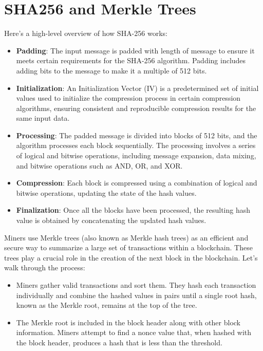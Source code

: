 \documentclass{article}
\begin{document}
\section{SHA256 and Merkle Trees}
Here's a high-level overview of how SHA-256 works:
\begin{itemize}
\item \textbf{Padding}: The input message is padded with length of message to ensure it meets certain requirements for the SHA-256 algorithm. Padding includes adding bits to the message to make it a multiple of 512 bits.
\item \textbf{Initialization}: An Initialization Vector (IV) is a predetermined set of initial values used to initialize the compression process in certain compression algorithms, ensuring consistent and reproducible compression results for the same input data.
\item \textbf{Processing}: The padded message is divided into blocks of 512 bits, and the algorithm processes each block sequentially. The processing involves a series of logical and bitwise operations, including message expansion, data mixing, and bitwise operations such as AND, OR, and XOR.
\item \textbf{Compression}: Each block is compressed using a combination of logical and bitwise operations, updating the state of the hash values.
\item \textbf{Finalization}: Once all the blocks have been processed, the resulting hash value is obtained by concatenating the updated hash values.
\end{itemize}
Miners use Merkle trees (also known as Merkle hash trees) as an efficient and secure way to summarize a large set of transactions within a blockchain. These trees play a crucial role in the creation of the next block in the blockchain. Let's walk through the process:
\begin{itemize}
    \item Miners gather valid transactions and sort them. They hash each transaction individually and combine the hashed values in pairs until a single root hash, known as the Merkle root, remains at the top of the tree.
    \item The Merkle root is included in the block header along with other block information. Miners attempt to find a nonce value that, when hashed with the block header, produces a hash that is less than the threshold.
\end{itemize}
\end{document}
